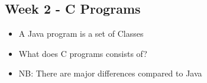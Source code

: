 
\subsection*{Week 2 - C Programs}
\begin{itemize}
\item A Java program is a set of Classes
\item What does C programs consists of?
\item NB: There are major differences compared to Java
\end{itemize}
